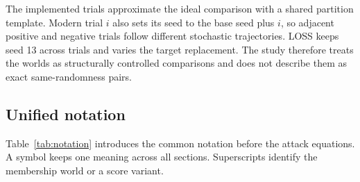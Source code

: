 \documentclass[11pt]{article}
\begin{document}
The implemented trials approximate the ideal comparison with a shared partition template. Modern trial $i$ also sets its seed to the base seed plus $i$, so adjacent positive and negative trials follow different stochastic trajectories. LOSS keeps seed 13 across trials and varies the target replacement. The study therefore treats the worlds as structurally controlled comparisons and does not describe them as exact same-randomness pairs.

\subsection{Unified notation}

Table~\ref{tab:notation} introduces the common notation before the attack equations. A symbol keeps one meaning across all sections. Superscripts identify the membership world or a score variant.
\end{document}
